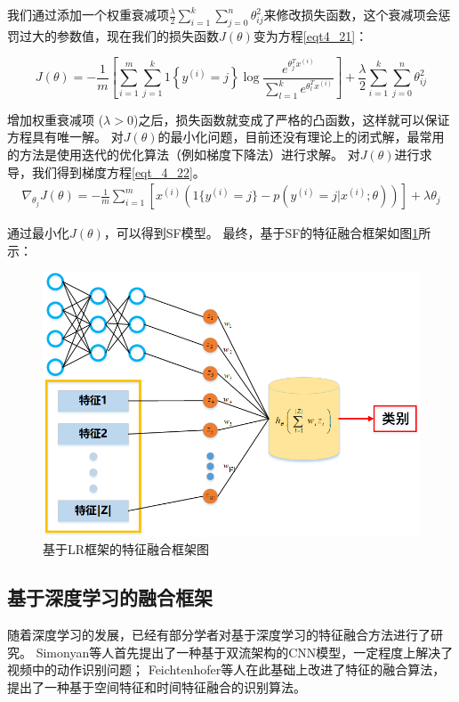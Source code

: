我们通过添加一个权重衰减项$\frac{\lambda}{2} \sum_{i=1}^k \sum_{j=0}^{n} \theta_{ij}^2$来修改损失函数，这个衰减项会惩罚过大的参数值，现在我们的损失函数$J(\theta)$变为方程\eqref{eqt4_21}：\par
\begin{equation}
	\label{eqt4_21}
	J(\theta) = - \frac{1}{m} \left[ \sum_{i=1}^{m} \sum_{j=1}^{k} 1\left\{y^{(i)} 
	= j\right\} \log \frac{e^{\theta_j^T x^{(i)}}}{\sum_{l=1}^k e^{ \theta_l^T x^{(i)} }}  \right]
	+ \frac{\lambda}{2} \sum_{i=1}^k \sum_{j=0}^n \theta_{ij}^2
\end{equation}

增加权重衰减项 ($\lambda > 0$)之后，损失函数就变成了严格的凸函数，这样就可以保证方程具有唯一解。
对$J(\theta)$的最小化问题，目前还没有理论上的闭式解，最常用的方法是使用迭代的优化算法（例如梯度下降法）进行求解。
对$J(\theta)$进行求导，我们得到梯度方程\eqref{eqt_4_22}。
\begin{align}
	\label{eqt_4_22}
	\nabla_{\theta_j} J(\theta) = - \frac{1}{m} \sum_{i=1}^{m}{ \left[ x^{(i)} ( 1\{ y^{(i)} = j\}  - p(y^{(i)} = j | x^{(i)}; \theta) ) \right]  } + \lambda \theta_j
\end{align}

通过最小化$J(\theta)$，可以得到SF模型。
最终，基于SF的特征融合框架如图\ref{sec:fig_4_2}所示：\par
\begin{figure}[!h]
	\centering
	\includegraphics[scale=0.7]{figures/chapter_4/fig_4_2}
	\caption{基于LR框架的特征融合框架图}\label{sec:fig_4_2}
\end{figure}


\subsection{基于深度学习的融合框架}
随着深度学习的发展，已经有部分学者对基于深度学习的特征融合方法进行了研究\cite{马永军2017一种基于深度学习模型的数据融合处理算法}\cite{王维智2015基于特征提取和特征选择的级联深度学习模型研究}。
Simonyan等人首先提出了一种基于双流架构的CNN模型，一定程度上解决了视频中的动作识别问题\cite{simonyan2014two}；
Feichtenhofer等人在此基础上改进了特征的融合算法，提出了一种基于空间特征和时间特征融合的识别算法\cite{feichtenhofer2016convolutional}。\par

